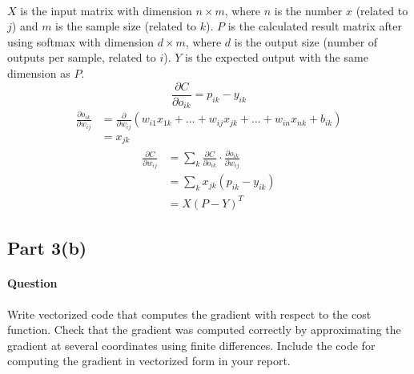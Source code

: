 \documentclass[11pt,twoside]{article}
\begin{document}
\\
$X$ is the input matrix with dimension $n \times m$, where $n$ is the number $x$ (related to $j$) and $m$ is the sample size (related to $k$). $P$ is the calculated result matrix after using softmax with dimension $d \times m$, where $d$ is the output size (number of outputs per sample, related to $i$). $Y$ is the expected output with the same dimension as $P$.
\[\frac{\partial C}{\partial o_{ik}} = p_{ik} - y_{ik}\]
\begin{align*}
\frac{\partial o_{ik}}{\partial w_{ij}} &= \frac{\partial}{\partial w_{ij}}(w_{i1}x_{1k}+\dots+w_{ij}x_{jk}+\dots+w_{in}x_{nk}+b_{ik})\\
&=x_{jk}
\end{align*}
\begin{align*}
\frac{\partial C}{\partial w_{ij}} &= \sum_{k}\frac{\partial C}{\partial o_{ik}} \cdot \frac{\partial o_{ik}}{\partial w_{ij}}\\
&= \sum_{k}x_{jk}(p_{ik} - y_{ik})\\
&= X(P - Y)^T
\end{align*}
\subsection*{Part 3(b)}
\paragraph{Question}
Write vectorized code that computes the gradient with respect to the cost function. Check that the gradient was computed correctly by approximating the gradient at several coordinates using finite differences. Include the code for computing the gradient in vectorized form in your report.
\end{document}
